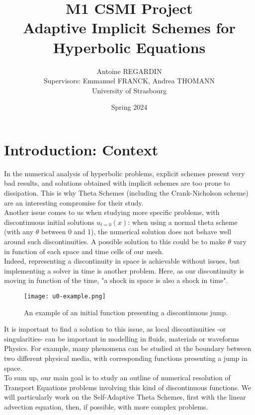 \documentclass[12pt]{article}
\begin{document}
\def\spacingset#1{\renewcommand{\baselinestretch}%
{#1}\small\normalsize} \spacingset{1}

\title{\bf M1 CSMI Project\\ Adaptive Implicit Schemes for Hyperbolic Equations}
\author{Antoine REGARDIN\hspace{.2cm}\\
    Supervisors: Emmanuel FRANCK, Andrea THOMANN\\
    University of Strasbourg\\ }
\date{Spring 2024}
\maketitle

\section{Introduction: Context}
In the numerical analysis of hyperbolic problems, explicit schemes present very bad results, and solutions obtained with implicit schemes
are too prone to dissipation. This is why Theta Schemes (including the Crank-Nicholson scheme) are an interesting compromise for their study.\\
Another issue comes to us when studying more specific problems, with discontinuous initial solutions $u_{t=0}(x)$: when using a normal theta scheme (with any $\theta$ between 0 and 1),
the numerical solution does not behave well around such discontinuities. A possible solution to this could be to make $\theta$ vary in function of each space and time cells of our mesh.\\
Indeed, representing a discontinuity in space is achievable without issues, but implementing a solver in time is another problem.
Here, as our discontinuity is moving in function of the time, "a shock in space is also a shock in time".\\
\vspace{10pt}
\begin{figure}[H]
    \centering
    \texttt{[image: u0-example.png]}
    \caption{An example of an initial function presenting a discontinuous jump.}
\end{figure}

It is important to find a solution to this issue, as local discontinuities -or singularities- can be important in modelling in fluids, materials or waveforms Physics.
For example, many phenomena can be studied at the boundary between two different physical media,
with corresponding functions presenting a jump in space.\\
To sum up, our main goal is to study an outline of numerical resolution of Transport Equations problems
involving this kind of discontinuous functions. We will particularly work on the Self-Adaptive Theta Schemes, 
first with the linear advection equation, then, if possible, with more complex problems.
\vspace{10pt}
\end{document}
